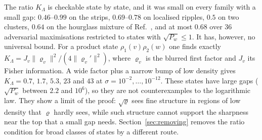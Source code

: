 The ratio $K_\Lambda$ is checkable state by state, and it was small on every family with a small gap: $0.46$--$0.99$ on the strips, $0.69$--$0.78$ on localised ripples, $0.5$ on two clusters, $0.64$ on the hourglass mixture of Ref.~\cite{namba2026gap}, and at most $0.68$ over 36 adversarial maximisations restricted to states with $\sqrt{P_w} \leq 1$. It has, however, no universal bound. For a product state $\rho_1(v)\rho_2(w)$ one finds exactly $K_\Lambda = J_v\|\varrho_v\|^2/(4\|\varrho_v'\|^2)$, where $\varrho_v$ is the blurred first factor and $J_v$ its Fisher information. A wide factor plus a narrow bump of low density gives $K_\Lambda = 0.7$, $1.7$, $5.3$, $23$ and $43$ at $\sigma = 10^{-2}, \dots, 10^{-12}$. These states have large gaps ($\sqrt{P_w}$ between $2.2$ and $10^6$), so they are not counterexamples to the logarithmic law. They show a limit of the proof: $\sqrt\varrho$ sees fine structure in regions of low density that $\varrho$ hardly sees, while such structure cannot support the sharpness near the top that a small gap needs. Section~\ref{sec:removing} removes the ratio condition for broad classes of states by a different route.
